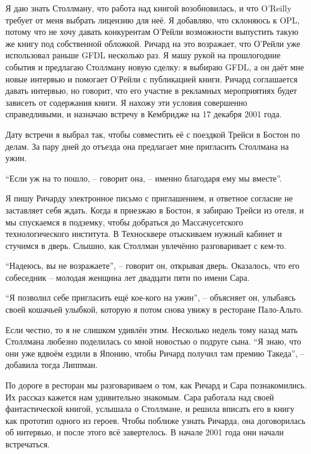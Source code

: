 Я даю знать Столлману, что работа над книгой возобновилась, и что O'Reilly требует от меня выбрать лицензию для неё. Я добавляю, что склоняюсь к OPL, потому что не хочу давать конкурентам О'Рейли возможности выпустить такую же книгу под собственной обложкой. Ричард на это возражает, что О'Рейли уже использовал раньше GFDL несколько раз. Я машу рукой на прошлогодние события и предлагаю Столлману новую сделку: я выбираю GFDL, а он даёт мне новые интервью и помогает О'Рейли с публикацией книги. Ричард соглашается давать интервью, но говорит, что его участие в рекламных мероприятиях будет зависеть от содержания книги. Я нахожу эти условия совершенно справедливыми, и назначаю встречу в Кембридже на 17 декабря 2001 года.

Дату встречи я выбрал так, чтобы совместить её с поездкой Трейси в Бостон по делам. За пару дней до отъезда она предлагает мне пригласить Столлмана на ужин.

\enquote{Если уж на то пошло, -- говорит она, -- именно благодаря ему мы вместе}.

Я пишу Ричарду электронное письмо с приглашением, и ответное согласие не заставляет себя ждать. Когда я приезжаю в Бостон, я забираю Трейси из отеля, и мы спускаемся в подземку, чтобы добраться до Массачусетского технологического института. В Техносквере отыскиваем нужный кабинет и стучимся в дверь. Слышно, как Столлман увлечённо разговаривает с кем-то.

\enquote{Надеюсь, вы не возражаете}, -- говорит он, открывая дверь. Оказалось, что его собеседник -- молодая женщина лет двадцати пяти по имени Сара.

\enquote{Я позволил себе пригласить ещё кое-кого на ужин}, -- объясняет он, улыбаясь своей кошачьей улыбкой, которую я потом снова увижу в ресторане Пало-Альто.

Если честно, то я не слишком удивлён этим. Несколько недель тому назад мать Столлмана любезно поделилась со мной новостью о подруге сына. \enquote{Я знаю, что они уже вдвоём ездили в Японию, чтобы Ричард получил там премию Такеда}, -- добавила тогда Липпман. 

По дороге в ресторан мы разговариваем о том, как Ричард и Сара познакомились. Их рассказ кажется нам удивительно знакомым. Сара работала над своей фантастической книгой, услышала о Столлмане, и решила вписать его в книгу как прототип одного из героев. Чтобы поближе узнать Ричарда, она договорилась об интервью, и после этого всё завертелось. В начале 2001 года они начали встречаться.

